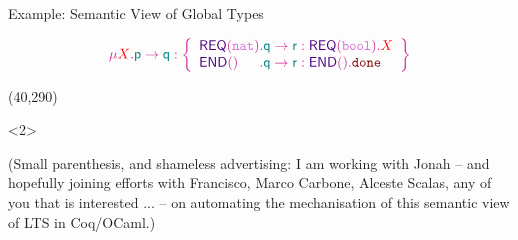 \begin{frame}{Example: Semantic View of Global Types}

  \begin{displaymath}
    \grecur X {
\gmsg \Rp \Rq {\left\{%
  \begin{array}{l@{}l}
   \dlbl{\mathsf{REQ}}(\snat) &. \gmsg \Rq \Rr {\dlbl{\mathsf{REQ}}(\sbool). \pvar{X}} \\
   \dlbl{\mathsf{END}}() &. \gmsg \Rq \Rr {\dlbl{\mathsf{END}}(). \pfinish}
  \end{array}
   \right\}}}
  \end{displaymath}

  \vspace{.3cm}

  \begin{center}
\end{center}

  \Put(40,290){%
    \begin{onlyenv}<2>
    \begin{minipage}{.86\columnwidth}
    \begin{greenbox}
      \large
      (Small parenthesis, and shameless advertising: I am working with Jonah
       -- and hopefully joining efforts with Francisco, Marco Carbone, Alceste Scalas, any of you that is interested ... -- on
       automating the mechanisation of this semantic view of LTS in Coq/OCaml.)
    \end{greenbox}
    \end{minipage}
    \end{onlyenv}
  }
\end{frame}

